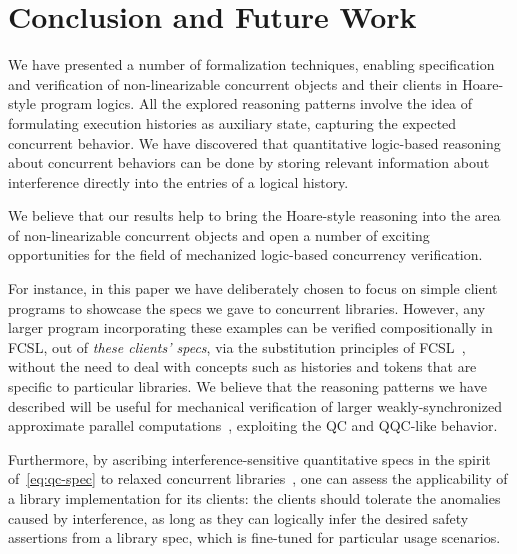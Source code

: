 
\section{Conclusion and Future Work}
\label{sec:conclusion}


We have presented a number of formalization techniques, enabling
specification and verification of non-linearizable concurrent objects
and their clients in Hoare-style program logics.
%
All the explored reasoning patterns involve the idea of formulating
execution histories as auxiliary state, capturing the expected
concurrent behavior.
%
We have discovered that quantitative logic-based reasoning about
concurrent behaviors can be done by storing relevant information about
interference directly into the entries of a logical history.

We believe that our results help to bring the Hoare-style reasoning
into the area of non-linearizable concurrent objects and open a number
of exciting opportunities for the field of mechanized logic-based
concurrency verification.

For instance, in this paper we have deliberately chosen to focus on
simple client programs to showcase the specs we gave to concurrent
libraries. However, any larger program incorporating these examples
can be verified compositionally in FCSL, out of \emph{these clients'
  specs}, via the substitution principles of
FCSL~\cite{Nanevski-al:ESOP14,Sergey-al:PLDI15}, without the need to
deal with concepts such as histories and tokens that are specific to
particular libraries. We believe that the reasoning patterns we have
described will be useful for mechanical verification of larger
weakly-synchronized approximate parallel
computations~\cite{Rinard:RACES}, exploiting the QC and QQC-like
behavior.

Furthermore, by ascribing interference-sensitive quantitative specs in
the spirit of~\eqref{eq:qc-spec} to relaxed concurrent
libraries~\cite{Henzinger-al:POPL13}, one can assess the applicability
of a library implementation for its clients: the clients should
tolerate the anomalies caused by interference, as long as they can
logically infer the desired safety assertions from a library spec,
which is fine-tuned for particular usage scenarios.



